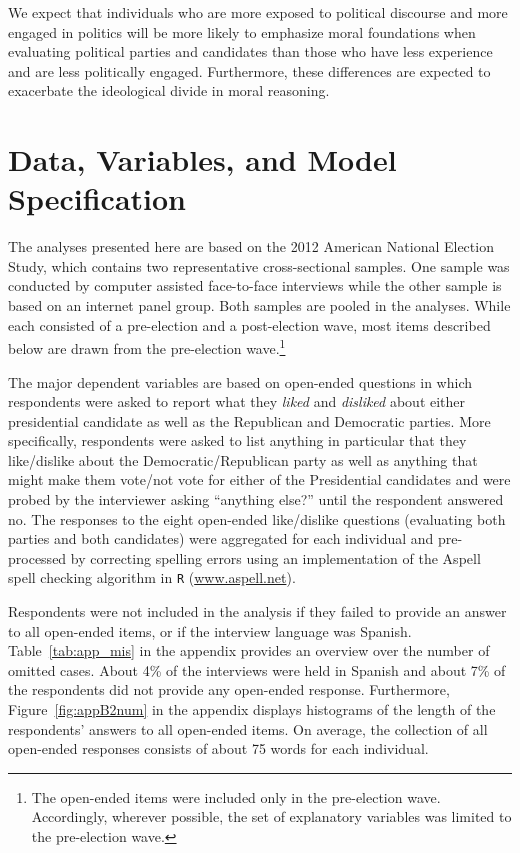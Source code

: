 \documentclass[12pt]{article}
\begin{document}
We expect that individuals who are more exposed to political discourse and more engaged in politics will be more likely to emphasize moral foundations when evaluating political parties and candidates than those who have less experience and are less politically engaged. Furthermore, these differences are expected to exacerbate the ideological divide in moral reasoning.


\section*{Data, Variables, and Model Specification}

The analyses presented here are based on the 2012 American National Election Study, which contains two representative cross-sectional samples. One sample was conducted by computer assisted face-to-face interviews while the other sample is based on an internet panel group. Both samples are pooled in the analyses. While each consisted of a pre-election and a post-election wave, most items described below are drawn from the pre-election wave.\footnote{The open-ended items were included only in the pre-election wave. Accordingly, wherever possible, the set of explanatory variables was limited to the pre-election wave.}

The major dependent variables are based on open-ended questions in which respondents were asked to report what they \textit{liked} and \textit{disliked} about either presidential candidate as well as the Republican and Democratic parties. More specifically, respondents were asked to list anything in particular that they like/dislike about the Democratic/Republican party as well as anything that might make them vote/not vote for either of the Presidential candidates and were probed by the interviewer asking ``anything else?'' until the respondent answered no. The responses to the eight open-ended like/dislike questions (evaluating both parties and both candidates) were aggregated for each individual and pre-processed by correcting spelling errors using an implementation of the Aspell spell checking algorithm in \texttt{R} (\url{www.aspell.net}).

Respondents were not included in the analysis if they failed to provide an answer to all open-ended items, or if the interview language was Spanish. Table~\ref{tab:app_mis} in the appendix provides an overview over the number of omitted cases. About 4\% of the interviews were held in Spanish and about 7\% of the respondents did not provide any open-ended response. Furthermore, Figure~\ref{fig:appB2num} in the appendix displays histograms of the length of the respondents' answers to all open-ended items. On average, the collection of all open-ended responses consists of about 75 words for each individual.
\end{document}
